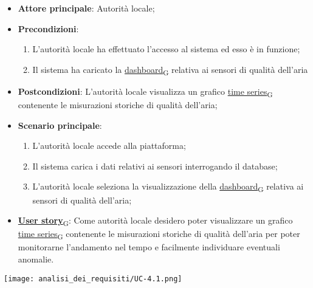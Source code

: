 \begin{itemize}
	\item \textbf{Attore principale}: Autorità locale;
	\item \textbf{Precondizioni}:
	      \begin{enumerate}
		      \item L'autorità locale ha effettuato l'accesso al sistema ed esso è in funzione;
		      \item Il sistema ha caricato la \href{https://7last.github.io/docs/rtb/documentazione-interna/glossario\#dashboard}{dashboard\textsubscript{G}} relativa ai sensori di qualità dell'aria
	      \end{enumerate}
	\item \textbf{Postcondizioni}: L'autorità locale visualizza un grafico \href{https://7last.github.io/docs/rtb/documentazione-interna/glossario\#time-series}{time series\textsubscript{G}} contenente le misurazioni storiche
	      di qualità dell'aria;
	\item \textbf{Scenario principale}:
	      \begin{enumerate}
		      \item L'autorità locale accede alla piattaforma;
		      \item Il sistema carica i dati relativi ai sensori interrogando il database;
		      \item L'autorità locale seleziona la visualizzazione della \href{https://7last.github.io/docs/rtb/documentazione-interna/glossario\#dashboard}{dashboard\textsubscript{G}} relativa ai sensori di qualità dell'aria;
	      \end{enumerate}
	\item \href{https://7last.github.io/docs/rtb/documentazione-interna/glossario\#user-story}{\textbf{User story}\textsubscript{G}}:
	      Come autorità locale desidero poter visualizzare un grafico \href{https://7last.github.io/docs/rtb/documentazione-interna/glossario\#time-series}{time series\textsubscript{G}} contenente le misurazioni storiche
	      di qualità dell'aria per poter monitorarne l'andamento nel tempo e facilmente individuare eventuali anomalie.
\end{itemize}
\begin{center}
	\texttt{[image: analisi\_dei\_requisiti/UC-4.1.png]}
\end{center}

